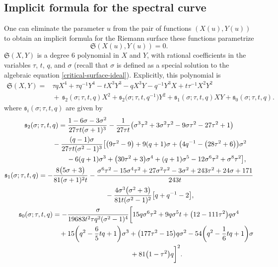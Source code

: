 \documentclass[pdftex]{sigma}
\numberwithin{equation}{section}
\begin{document}
\subsection{Implicit formula for the spectral curve}
One can eliminate the parameter $u$ from the pair of functions $(X(u),Y(u))$ to obtain an implicit formula for the Riemann surface these functions parametrize
 \begin{equation*}
 \mathfrak{S}(X(u),Y(u)) = 0.
 \end{equation*}
$\mathfrak{S}(X,Y)$ is a degree $6$ polynomial in $X$ and $Y$, with rational coefficients in the variables $\tau$, $t$, $q$, and $\sigma$ (recall that $\sigma$ is defined as a special solution to the algebraic equation \eqref{critical-surface-ideal}). Explicitly, this polynomial is
 \begin{align*}
 \mathfrak{S}(X,Y)={}& \tau q X^4 + \tau q^{-1}Y^4 -tX^3Y^3 - qX^3Y - q^{-1}Y^3X + t\tau^{-1}X^2Y^2\\
 &{}{+}\, \mathfrak{s}_2(\sigma;\tau,t,q) X^2 + \mathfrak{s}_2\bigl(\sigma;\tau,t,q^{-1}\bigr) Y^2 + \mathfrak{s}_1(\sigma;\tau,t,q) XY + \mathfrak{s}_0(\sigma;\tau,t,q).\nonumber
 \end{align*}
where $\mathfrak{s}_i(\sigma;\tau,t,q)$ are given by
 \begin{gather*}
 \mathfrak{s}_2(\sigma;\tau,t,q) = \frac{1-6\sigma-3\sigma^2}{27\tau t (\sigma+1)^3} - \frac{1}{27\tau t}\bigl(\sigma^{3} \tau^{2}+3 \sigma^{2} \tau^{2}-9 \sigma \tau^{2}-27 \tau^{2}+1\bigr) \nonumber\\
 \hphantom{\mathfrak{s}_2(\sigma;\tau,t,q) =}{}
 -\frac{(q-1)\sigma}{27\tau t(\sigma^2 - 1)^3}\bigl[\bigl(9 \tau^{2}-9\bigr)+9(q+1) \sigma +\bigl(4q^{-1}-\bigl(28 \tau^{2}+6\bigr) \bigr) \sigma^{2} \\
 \hphantom{\mathfrak{s}_2(\sigma;\tau,t,q) =}\qquad{}
 -6(q+1 ) \sigma^{3}+\bigl(30 \tau^{2}+3\bigr)\sigma^{4}+(q+1) \sigma^{5}-12\sigma^{6} \tau^{2}+\sigma^{8} \tau^{2}\bigr]\nonumber,\\
 \mathfrak{s}_1(\sigma;\tau,t,q) = -\frac{8 \bigl(5 \sigma +3\bigr)}{81 (\sigma +1)^{2} t} -\frac{\sigma^{6} \tau^{2}-15 \sigma^{4} \tau^{2}+27 \sigma^{2} \tau^{2}-3 \sigma^{2}+243 \tau^{2}+24 \sigma +171}{243 t}\nonumber\\
 \hphantom{\mathfrak{s}_1(\sigma;\tau,t,q) =}{}
 -\frac{4\sigma^3\bigl(\sigma^2+3\bigr)}{81t(\sigma^2 - 1)^2}\bigl[q+q^{-1}-2\bigr],\\
 \mathfrak{s}_0(\sigma;\tau,t,q) = -\frac{\sigma}{19683t^2\tau q^2(\sigma^2 - 1)^4}\biggl[15 q \sigma^{6} \tau^{2}+9 q \sigma^{5} t +\bigl(12-111 \tau^{2}\bigr) q\sigma^{4} \nonumber \\
 \hphantom{\mathfrak{s}_0(\sigma;\tau,t,q) =}\qquad{}
 +15\biggl(q^{2}-\frac{6}{5}t q +1\biggr) \sigma^{3}+\bigl(177 \tau^{2}-15\bigr) q \sigma^{2}-54\biggl(q^{2}-\frac{1}{6}t q +1\biggr) \sigma\nonumber\\
 \hphantom{\mathfrak{s}_0(\sigma;\tau,t,q) =}\qquad{}
 + 81\bigl(1-\tau^{2}\bigr) q\biggr]^2.
 \end{gather*}
\end{document}
